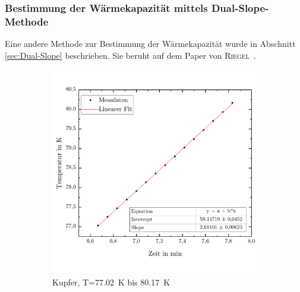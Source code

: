\documentclass[parskip=half, a4paper,twoside,final]{article}
\begin{document}
\subsubsection{Bestimmung der Wärmekapazität mittels Dual-Slope-Methode}
Eine andere Methode zur Bestimmung der Wärmekapazität wurde in Abschnitt \ref{sec:Dual-Slope} beschrieben. Sie beruht auf dem Paper von \textsc{Riegel}~\cite{Riegel}.

\begin{figure}[ht!]
  \centering
  \begin{subfigure}[b!]{0.49\textwidth}
    \vspace{-.5cm}
    \includegraphics[width=\textwidth]{Bilder/77_02__80_17_Anstieg.pdf}
    \vspace{-1cm}
    \caption{Kupfer, T=\SI{77,02}{\kelvin} bis \SI{80,17}{\kelvin}}
  \end{subfigure}
  \hfill
  \begin{subfigure}[b!]{0.49\textwidth}
    \vspace{-.5cm}

\end{subfigure}
\end{figure}
\end{document}
